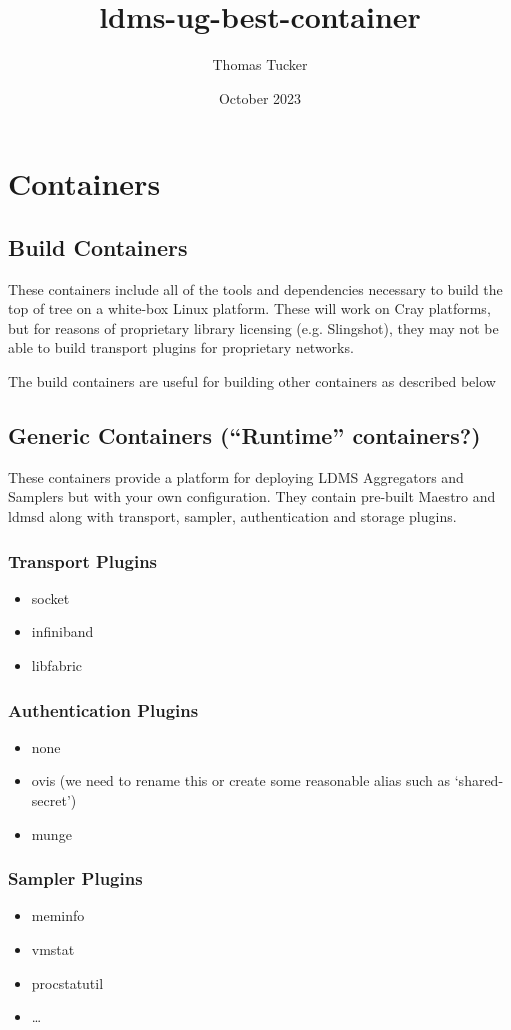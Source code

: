 \documentclass{article}
\title{ldms-ug-best-container}
\author{Thomas Tucker}
\date{October 2023}
\begin{document}
\section{Containers}
\subsection{Build Containers}
These containers include all of the tools and dependencies necessary to build the top of tree on a white-box Linux platform. These will work on Cray platforms, but for reasons of proprietary library licensing (e.g. Slingshot), they may not be able to build transport plugins for proprietary networks.

The build containers are useful for building other containers as described below
\subsection{Generic Containers (“Runtime” containers?)}
These containers provide a platform for deploying LDMS Aggregators and Samplers but with your own configuration. They contain pre-built Maestro and ldmsd along with transport, sampler, authentication and storage plugins.

\subsubsection{Transport Plugins}
\begin{itemize}
    \item socket
\item infiniband
\item libfabric
\end{itemize}
\subsubsection{Authentication Plugins}
\begin{itemize}
    \item none
    \item ovis (we need to rename this or create some reasonable alias such as ‘shared-secret’)
    \item munge
\end{itemize}
\subsubsection{Sampler Plugins}
\begin{itemize}
\item meminfo
\item vmstat
\item procstatutil
\item …
\end{itemize}
\end{document}

